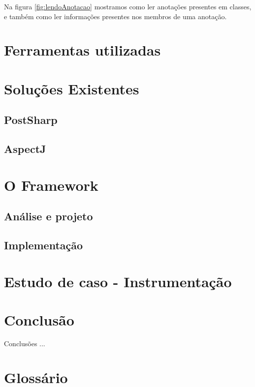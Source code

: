 \documentclass[tc,openright]{iiufrgs}
\begin{document}
Na figura \ref{fig:lendoAnotacao} mostramos como ler anotações presentes em classes, e também como ler informações presentes nos membros de uma anotação.


\chapter{Ferramentas utilizadas}

\chapter{Soluções Existentes}

\section{PostSharp}

\section{AspectJ}

\chapter{O Framework}

\section{Análise e projeto}

\section{Implementação}

\chapter{Estudo de caso - Instrumentação}

\chapter{Conclusão}

Conclusões ...



\chapter*{Glossário}
\end{document}
